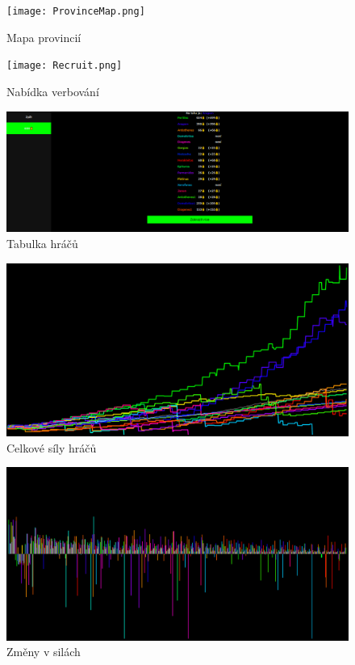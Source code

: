 \documentclass[a4paper,12pt]{article}
\begin{document}
\begin{figure}[H]
	\texttt{[image: ProvinceMap.png]}
	\caption{Mapa provincií}
	\label{map}
\end{figure}
\begin{figure}[H]
	\texttt{[image: Recruit.png]}
	\caption{Nabídka verbování}
	\label{recruit}
\end{figure}
\begin{figure}[H]
	\includegraphics[width=\textwidth]{Players.png}
	\caption{Tabulka hráčů}
	\label{players}
\end{figure}
\begin{figure}[H]
	\includegraphics[width=\textwidth]{PowersGraph.png}
	\caption{Celkové síly hráčů}
	\label{graph1}
\end{figure}
\begin{figure}[H]
	\includegraphics[width=\textwidth]{ChangesGraph.png}
	\caption{Změny v silách}
	\label{graph2}
\end{figure}
\end{document}
